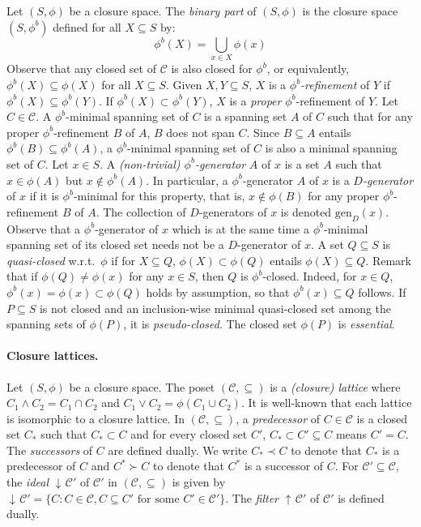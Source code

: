 \documentclass[12pt, a4paper]{article}
\newcommand{\cc}[1]{\mathcal{#1}}  %
\newcommand{\st}{:}  %
\newcommand{\U}{S}  %
\DeclareMathOperator{\ftr}{\uparrow\!}  %
\DeclareMathOperator{\idl}{\downarrow\!}  %
\DeclareMathOperator{\mt}{\land}  %
\DeclareMathOperator{\jn}{\lor}  %
\newcommand{\cl}{\phi}  %
\newcommand{\cs}{\cc{C}} %
\newcommand{\gen}{\mathrm{gen}}  %
\begin{document}
Let $(\U, \cl)$ be a closure space.
The \emph{binary part} of $(\U, \cl)$ is the closure space $(\U, \cl^b)$ defined for all $X \subseteq \U$ by:
%
\[ 
\cl^b(X) = \bigcup_{x \in X} \cl(x)
\]
%
Observe that any closed set of $\cs$ is also closed for $\cl^b$, or equivalently, $\cl^b(X) \subseteq \cl(X)$ for all $X \subseteq \U$.
Given $X, Y \subseteq \U$, $X$ is a \emph{$\cl^b$-refinement} of $Y$ if $\cl^b(X) \subseteq \cl^b(Y)$. 
If $\cl^b(X) \subset \cl^b(Y)$, $X$ is a \emph{proper} $\cl^b$-refinement of $Y$.
Let $C \in \cs$.
A $\cl^b$-minimal spanning set of $C$ is a spanning set $A$ of $C$ such that for any proper $\cl^b$-refinement $B$ of $A$, $B$ does not span $C$.
Since $B \subseteq A$ entails $\cl^b(B) \subseteq \cl^b(A)$, a $\cl^b$-minimal spanning set of $C$ is also a minimal spanning set of $C$.
Let $x \in \U$.
A \emph{(non-trivial) $\cl^b$-generator} $A$ of $x$ is a set $A$ such that $x \in \cl(A)$ but $x \notin \cl^b(A)$.
In particular, a $\cl^b$-generator $A$ of $x$ is a \emph{$D$-generator} of $x$ if it is $\cl^b$-minimal for this property, that is, $x \notin \cl(B)$ for any proper $\cl^b$-refinement $B$ of $A$.
The collection of $D$-generators of $x$ is denoted $\gen_D(x)$.
Observe that a $\cl^b$-generator of $x$ which is at the same time a $\cl^b$-minimal spanning set of its closed set needs not be a $D$-generator of $x$.
A set $Q \subseteq \U$ is \emph{quasi-closed} w.r.t.~$\cl$ if for $X \subseteq Q$, $\cl(X) \subset \cl(Q)$ entails $\cl(X) \subseteq Q$.
Remark that if $\cl(Q) \neq \cl(x)$ for any $x \in \U$, then $Q$ is $\cl^b$-closed.
Indeed, for $x \in Q$, $\cl^b(x) = \cl(x) \subset \cl(Q)$ holds by assumption, so that $\cl^b(x) \subseteq Q$ follows.
If $P \subseteq \U$ is not closed and an inclusion-wise minimal quasi-closed set among the spanning sets of $\cl(P)$, it is \emph{pseudo-closed}.
The closed set $\cl(P)$ is \emph{essential}.


\paragraph{Closure lattices.}
Let $(\U, \cl)$ be a closure space.
The poset $(\cs, \subseteq)$ is a \emph{(closure) lattice} where $C_1 \mt C_2 = C_1 \cap C_2$ and $C_1 \jn C_2 = \cl(C_1 \cup C_2)$.
It is well-known that each lattice is isomorphic to a closure lattice.
In $(\cs, \subseteq)$, a \emph{predecessor} of $C \in \cs$ is a closed set $C_*$ such that $C_* \subset C$ and for every closed set $C'$, $C_* \subset C' \subseteq C$ means $C' = C$.
The \emph{successors} of $C$ are defined dually.
We write $C_* \prec C$ to denote that $C_*$ is a predecessor of $C$ and $C^* \succ C$ to denote that $C^*$ is a successor of $C$. 
For $\cs' \subseteq \cs$, the \emph{ideal} $\idl \cs'$ of $\cs'$ in $(\cs, \subseteq)$ is given by $\idl \cs' = \{C \st C \in \cs, C \subseteq C' \text{ for some } C' \in \cs'\}$.
The \emph{filter} $\ftr \cs'$ of $\cs'$ is defined dually.
\end{document}
